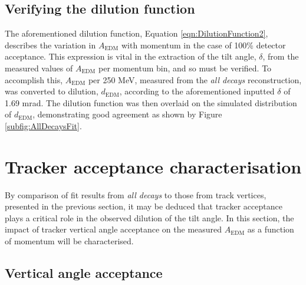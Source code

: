 \subsection{Verifying the dilution function}

The aforementioned dilution function, Equation \ref{eqn:DilutionFunction2}, describes the variation in $A_{\text{EDM}}$ with momentum in the case of 100\% detector acceptance. This expression is vital in the extraction of the tilt angle, $\delta$, from the measured values of $A_{\text{EDM}}$ per momentum bin, and so must be verified. To accomplish this, $A_{\text{EDM}}$ per 250 MeV, measured from the \textit{all decays} reconstruction, was converted to dilution, $d_{\text{EDM}}$, according to the aforementioned inputted $\delta$ of 1.69 mrad. The dilution function was then overlaid on the simulated distribution of $d_{\text{EDM}}$, demonstrating good agreement as shown by Figure \ref{subfig:AllDecaysFit}. 

\section{Tracker acceptance characterisation}\label{sec:AcceptanceSim}

By comparison of fit results from \textit{all decays} to those from track vertices, presented in the previous section, it may be deduced that tracker acceptance plays a critical role in the observed dilution of the tilt angle. In this section, the impact of tracker vertical angle acceptance on the measured $A_{\text{EDM}}$ as a function of momentum will be characterised.

\subsection{Vertical angle acceptance}

